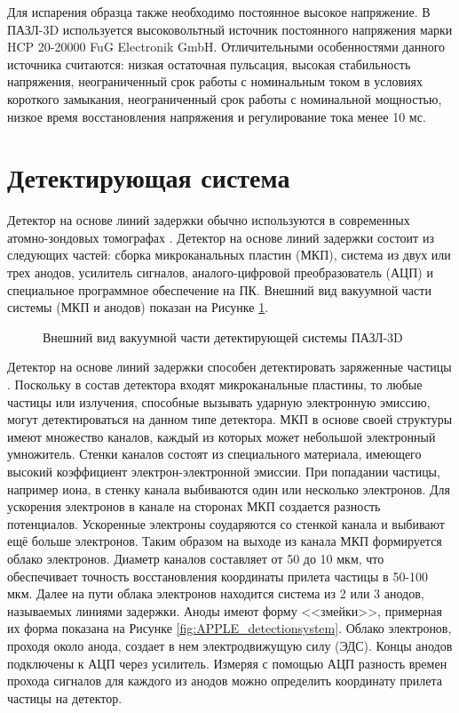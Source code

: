 Для испарения образца также необходимо постоянное высокое напряжение. В ПАЗЛ-3D используется высоковольтный источник постоянного напряжения марки HCP 20-20000 FuG Electronik GmbH. Отличительными особенностями данного источника считаются: низкая остаточная пульсация, высокая стабильность напряжения, неограниченный срок работы с номинальным током в условиях короткого замыкания, неограниченный срок работы с номинальной мощностью, низкое время восстановления напряжения и регулирование тока менее 10 мс.  



\FloatBarrier

\section{Детектирующая система}\label{sec:ch2/sec4}

Детектор на основе линий задержки обычно используются в современных атомно-зондовых томографах \cite{Stender07,DaCosta05}. Детектор на основе линий задержки состоит из следующих частей: сборка микроканальных пластин (МКП), система из двух или трех анодов, усилитель сигналов, аналого-цифровой преобразователь (АЦП) и специальное программное обеспечение на ПК. Внешний вид вакуумной части системы (МКП и анодов) показан на Рисунке \cref{fig:DetectionsystemFoto}.

\begin{figure}[htb]
	\caption{Внешний вид вакуумной части детектирующей системы ПАЗЛ-3D}
	\label{fig:DetectionsystemFoto}	
\end{figure}

Детектор на основе линий задержки способен детектировать заряженные частицы \cite{Spillman00} . Поскольку в состав детектора входят микроканальные пластины, то любые частицы или излучения, способные вызывать ударную электронную эмиссию, могут детектироваться на данном типе детектора. МКП в основе своей структуры имеют множество каналов, каждый из которых может небольшой электронный умножитель. Стенки каналов состоят из специального материала, имеющего высокий коэффициент электрон-электронной эмиссии. При попадании частицы, например иона, в стенку канала выбиваются один или несколько электронов. Для ускорения электронов в канале на сторонах МКП создается разность потенциалов. Ускоренные электроны соударяются со стенкой канала и выбивают ещё больше электронов. Таким образом на выходе из канала МКП формируется облако электронов. Диаметр каналов составляет от 50 до 10 мкм, что обеспечивает точность восстановления координаты прилета частицы в 50-100 мкм. Далее на пути облака электронов находится система из 2 или 3 анодов, называемых линиями задержки. Аноды имеют форму <<змейки>>, примерная их форма показана на Рисунке \cref{fig:APPLE_detectionsystem}. Облако электронов, проходя около анода, создает в нем электродвижущую силу (ЭДС). Концы анодов подключены к АЦП через усилитель. Измеряя с помощью АЦП разность времен прохода сигналов для каждого из анодов можно определить координату прилета частицы на детектор.

